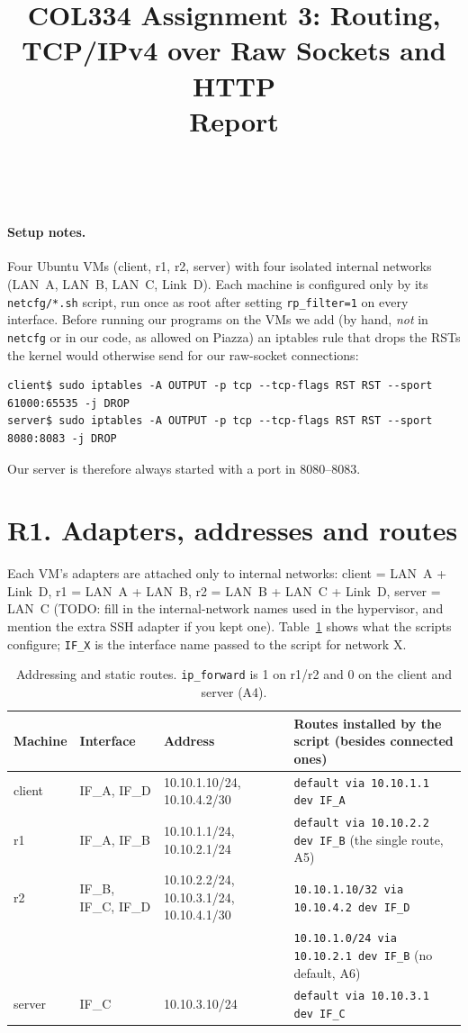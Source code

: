 \documentclass[10pt,a4paper]{article}
\title{COL334 Assignment 3: Routing, TCP/IPv4 over Raw Sockets and HTTP\\[2pt]\large Report}
\author{\teamA \\ \teamB}
\date{}
\newcommand{\cmd}[1]{\texttt{#1}}
\begin{document}
\maketitle
\vspace{-2em}

\paragraph{Setup notes.}
Four Ubuntu VMs (client, r1, r2, server) with four isolated internal networks
(LAN~A, LAN~B, LAN~C, Link~D). Each machine is configured only by its
\cmd{netcfg/*.sh} script, run once as root after setting \cmd{rp\_filter=1} on every
interface. Before running our programs on the VMs we add (by hand, \emph{not} in
\cmd{netcfg} or in our code, as allowed on Piazza) an iptables rule that drops the
RSTs the kernel would otherwise send for our raw-socket connections:
\begin{lstlisting}
client$ sudo iptables -A OUTPUT -p tcp --tcp-flags RST RST --sport 61000:65535 -j DROP
server$ sudo iptables -A OUTPUT -p tcp --tcp-flags RST RST --sport 8080:8083 -j DROP
\end{lstlisting}
Our server is therefore always started with a port in 8080--8083.

\section*{R1. Adapters, addresses and routes}

Each VM's adapters are attached only to internal networks: client = LAN~A + Link~D,
r1 = LAN~A + LAN~B, r2 = LAN~B + LAN~C + Link~D, server = LAN~C
(TODO: fill in the internal-network names used in the hypervisor, and mention the extra
SSH adapter if you kept one). Table~\ref{tab:addr} shows what the scripts configure;
\cmd{IF\_X} is the interface name passed to the script for network X.

\begin{table}[H]\centering\small
\begin{tabular}{@{}lp{1.9cm}p{2.6cm}p{8.2cm}@{}}
\toprule
Machine & Interface & Address & Routes installed by the script (besides connected ones)\\
\midrule
client & IF\_A, IF\_D & 10.10.1.10/24, 10.10.4.2/30 & \cmd{default via 10.10.1.1 dev IF\_A}\\
r1     & IF\_A, IF\_B & 10.10.1.1/24, 10.10.2.1/24 & \cmd{default via 10.10.2.2 dev IF\_B} (the single route, A5)\\
r2     & IF\_B, IF\_C, IF\_D & 10.10.2.2/24, 10.10.3.1/24, 10.10.4.1/30 &
          \cmd{10.10.1.10/32 via 10.10.4.2 dev IF\_D}\\
       & & & \cmd{10.10.1.0/24 via 10.10.2.1 dev IF\_B} (no default, A6)\\
server & IF\_C & 10.10.3.10/24 & \cmd{default via 10.10.3.1 dev IF\_C}\\
\bottomrule
\end{tabular}
\caption{Addressing and static routes. \cmd{ip\_forward} is 1 on r1/r2 and 0 on the client and server (A4).}
\label{tab:addr}
\end{table}
\end{document}
